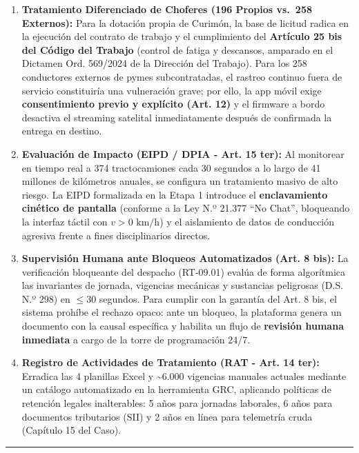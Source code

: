 \begin{enumerate}
\def\labelenumi{\arabic{enumi}.}
\tightlist
\item
  \textbf{Tratamiento Diferenciado de Choferes (196 Propios vs.~258 Externos):} Para la dotación propia de Curimón, la base de licitud radica en la ejecución del contrato de trabajo y el cumplimiento del \textbf{Artículo 25 bis del Código del Trabajo} (control de fatiga y descansos, amparado en el Dictamen Ord. 569/2024 de la Dirección del Trabajo). Para los 258 conductores externos de pymes subcontratadas, el rastreo continuo fuera de servicio constituiría una vulneración grave; por ello, la app móvil exige \textbf{consentimiento previo y explícito (Art. 12)} y el firmware a bordo desactiva el streaming satelital inmediatamente después de confirmada la entrega en destino.
\item
  \textbf{Evaluación de Impacto (EIPD / DPIA - Art. 15 ter):} Al monitorear en tiempo real a 374 tractocamiones cada 30 segundos a lo largo de 41 millones de kilómetros anuales, se configura un tratamiento masivo de alto riesgo. La EIPD formalizada en la Etapa 1 introduce el \textbf{enclavamiento cinético de pantalla} (conforme a la Ley N.º 21.377 ``No Chat'', bloqueando la interfaz táctil con \(v > 0\text{ km/h}\)) y el aislamiento de datos de conducción agresiva frente a fines disciplinarios directos.
\item
  \textbf{Supervisión Humana ante Bloqueos Automatizados (Art. 8 bis):} La verificación bloqueante del despacho (RT-09.01) evalúa de forma algorítmica las invariantes de jornada, vigencias mecánicas y sustancias peligrosas (D.S. N.º 298) en \(\le 30\) segundos. Para cumplir con la garantía del Art. 8 bis, el sistema prohíbe el rechazo opaco: ante un bloqueo, la plataforma genera un documento con la causal específica y habilita un flujo de \textbf{revisión humana inmediata} a cargo de la torre de programación 24/7.
\item
  \textbf{Registro de Actividades de Tratamiento (RAT - Art. 14 ter):} Erradica las 4 planillas Excel y \textasciitilde6.000 vigencias manuales actuales mediante un catálogo automatizado en la herramienta GRC, aplicando políticas de retención legales inalterables: 5 años para jornadas laborales, 6 años para documentos tributarios (SII) y 2 años en línea para telemetría cruda (Capítulo 15 del Caso).
\end{enumerate}

\begin{center}\rule{0.5\linewidth}{0.5pt}\end{center}


